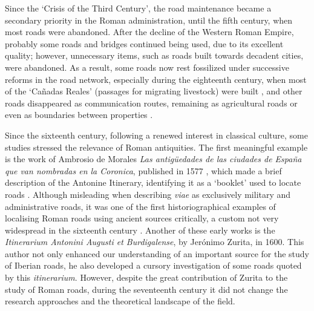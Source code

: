 	Since the ‘Crisis of the Third Century’, the road maintenance became a secondary priority in the Roman administration, until the fifth century, when most roads were abandoned. After the decline of the Western Roman Empire, probably some roads and bridges continued being used, due to its excellent quality; however, unnecessary items, such as roads built towards decadent cities, were abandoned. As a result, some roads now rest fossilized under successive reforms in the road network, especially during the eighteenth century, when most of the ‘Cañadas Reales’ (passages for migrating livestock) were built \parencite[14]{Moreno_2010}, and other roads disappeared as communication routes, remaining as agricultural roads or even as boundaries between properties \parencite[11]{Moreno_2010}.
	
	
	Since the sixteenth century, following a renewed interest in classical culture, some studies stressed the relevance of Roman antiquities. The first meaningful example is the work of Ambrosio de Morales \textit{Las antigüedades de las ciudades de España que van nombradas en la Coronica}, published in 1577 \parencite[13]{Abascal_2012}, which made a brief description of the Antonine Itinerary, identifying it as a ‘booklet’ used to locate roads \parencite[20--22]{Morales_1792}. Although misleading when describing \textit{viae} as exclusively military and administrative roads, it was one of the first historiographical examples of localising Roman roads using ancient sources critically, a custom not very widespread in the sixteenth century \parencite[15]{Abascal_2012}. Another of these early works is the \textit{Itinerarium Antonini Augusti et Burdigalense}, by Jerónimo Zurita, in 1600. This author not only enhanced our understanding of an important source for the study of Iberian roads, he also developed a cursory investigation of some roads quoted by this \textit{itinerarium}. However, despite the great contribution of Zurita to the study of Roman roads, during the seventeenth century it did not change the research approaches and the theoretical landscape of the field.
	
